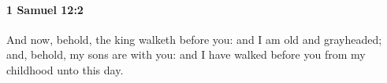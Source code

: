 
		\paragraph{1 Samuel 12:2} %
			\label{1SAMUEL-12-2}

			And now, behold, the king walketh before you: and I am old and grayheaded; and, behold, my sons are with you: and I have walked before you from my childhood unto this day.



